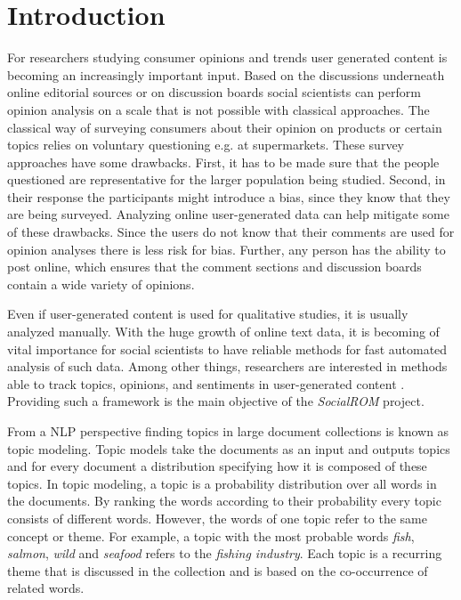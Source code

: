 %
\chapter{Introduction}

For researchers studying consumer opinions and trends user generated content is becoming an increasingly important input. Based on the discussions underneath online editorial sources or on discussion boards social scientists can perform opinion analysis on a scale that is not possible with classical approaches.
The classical way of surveying consumers about their opinion on products or certain topics relies on voluntary questioning e.g. at supermarkets. These survey approaches have some drawbacks. First, it has to be made sure that the people questioned are representative for the larger population being studied. Second, in their response the participants might introduce a bias, since they know that they are being surveyed. Analyzing online user-generated data can help mitigate some of these drawbacks. Since the users do not know that their comments are used for opinion analyses there is less risk for bias. Further, any person has the ability to post online, which ensures that the comment sections and discussion boards contain a wide variety of opinions.

Even if user-generated content is used for qualitative studies, it is usually analyzed manually. With the huge growth of online text data, it is becoming of vital importance for social scientists to have reliable methods for fast automated analysis of such data. Among other things, researchers are interested in methods able to track topics, opinions, and sentiments in user-generated content \citep{Nikolenko2017}. Providing such a framework is the main objective of the \textit{SocialROM} project.

From a NLP perspective finding topics in large document collections is known as topic modeling. Topic models take the documents as an input and outputs topics and for every document a distribution specifying how it is composed of these topics. In topic modeling, a topic is a probability distribution over all words in the documents. By ranking the words according to their probability every topic consists of different words. However, the words of one topic refer to the same concept or theme. For example, a topic with the most probable words \textit{fish}, \textit{salmon}, \textit{wild} and \textit{seafood} refers to the \textit{fishing industry}. Each topic is a recurring theme that is discussed in the collection and is based on the co-occurrence of related words.

